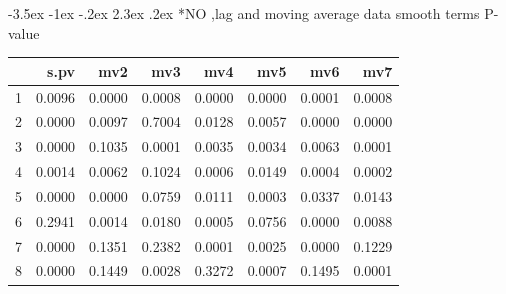 \documentclass[a4paper, 12pt]{article}
\makeatletter
\def\Large{\fontsize{16}{24}\selectfont}
\renewcommand\section{\@startsection {section}{1}{\z@}%
                                   {-3.5ex \@plus -1ex \@minus -.2ex}%
                                   {2.3ex \@plus.2ex}%
                                   {\centering\normalfont\Large\bfseries}}
\makeatother
\begin{document}
\section*{NO ,lag and moving average data}
smooth terms P-value
\begin{table}[ht]
\centering
\begin{tabular}{rrrrrrrr}
  \hline
 & s.pv & mv2 & mv3 & mv4 & mv5 & mv6 & mv7 \\
  \hline
1 & 0.0096 & 0.0000 & 0.0008 & 0.0000 & 0.0000 & 0.0001 & 0.0008 \\
  2 & 0.0000 & 0.0097 & 0.7004 & 0.0128 & 0.0057 & 0.0000 & 0.0000 \\
  3 & 0.0000 & 0.1035 & 0.0001 & 0.0035 & 0.0034 & 0.0063 & 0.0001 \\
  4 & 0.0014 & 0.0062 & 0.1024 & 0.0006 & 0.0149 & 0.0004 & 0.0002 \\
  5 & 0.0000 & 0.0000 & 0.0759 & 0.0111 & 0.0003 & 0.0337 & 0.0143 \\
  6 & 0.2941 & 0.0014 & 0.0180 & 0.0005 & 0.0756 & 0.0000 & 0.0088 \\
  7 & 0.0000 & 0.1351 & 0.2382 & 0.0001 & 0.0025 & 0.0000 & 0.1229 \\
  8 & 0.0000 & 0.1449 & 0.0028 & 0.3272 & 0.0007 & 0.1495 & 0.0001 \\
   \hline
\end{tabular}
\end{table}
\clearpage
\end{document}
